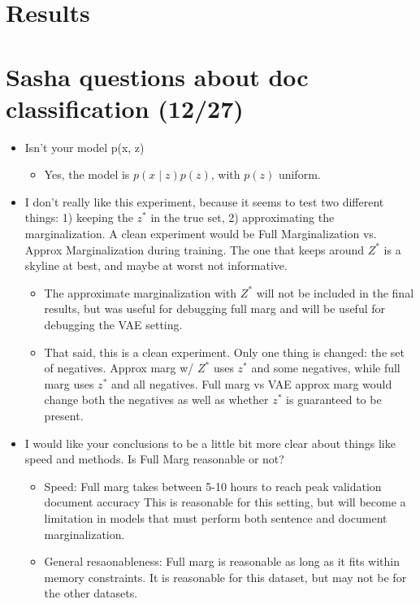 \documentclass[11pt]{article}
\begin{document}
\section{Results}\section{Sasha questions about doc classification (12/27)}
\begin{itemize}
\item Isn't your model p(x, z)
    \begin{itemize}
    \item Yes, the model is $p(x\mid z)p(z)$, with $p(z)$ uniform.
    \end{itemize}
\item I don't really like this experiment, because it seems to test two different things:
    1) keeping the $z^*$ in the true set, 2) approximating the marginalization.
    A clean experiment would be Full Marginalization vs. Approx Marginalization during training.
    The one that keeps around $Z^*$ is a skyline at best, and maybe at worst not informative.
    \begin{itemize}
    \item The approximate marginalization with $Z^*$ will not be included in the final results,
        but was useful for debugging full marg and will be useful for debugging the VAE setting.
    \item That said, this is a clean experiment. Only one thing is changed: the set of negatives.
        Approx marg w/ $Z^*$ uses $z^*$ and some negatives,
        while full marg uses $z^*$ and all negatives.
        Full marg vs VAE approx marg would change both the negatives as well as whether $z^*$
            is guaranteed to be present.
    \end{itemize}
\item I would like your conclusions to be a little bit more clear about things like
    speed and methods. Is Full Marg reasonable or not?
    \begin{itemize}
    \item Speed: Full marg takes between 5-10 hours to reach peak validation document accuracy
        This is reasonable for this setting, but will become a limitation in models
        that must perform both sentence and document marginalization.
    \item General resaonableness: Full marg is reasonable as long as it fits within memory constraints.
        It is reasonable for this dataset, but may not be for the other datasets.

\end{itemize}
\end{itemize}
\end{document}

